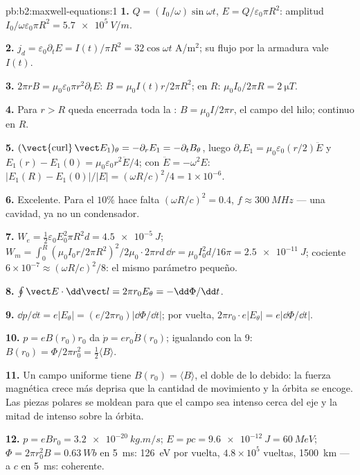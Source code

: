 \begin{solution}{pb:b2:maxwell-equations:1}
\textbf{1.} $Q = (I_0/\omega)\sin\omega t$, $E = Q/\varepsilon_0\pi R^2$: amplitud $I_0/\omega\varepsilon_0
\pi R^2 = \qty{5.7e5}{V/m}$.

\textbf{2.} $j_d = \varepsilon_0\partial_tE = I(t)/\pi R^2 = 32\cos\omega t$ A/m$^2$; su flujo
por la armadura vale $I(t)$.

\textbf{3.} $2\pi rB = \mu_0\varepsilon_0\pi r^2\partial_tE$: $B = \mu_0I(t)r/2\pi R^2$; en $R$:
$\mu_0I_0/2\pi R = \qty{2}{\micro T}$.

\textbf{4.} Para $r > R$ queda encerrada toda la : $B =
\mu_0I/2\pi r$, el campo del hilo; continuo en $R$.

\textbf{5.} $(\operatorname{\vect{curl}}\vect E_1)_\theta = -\partial_rE_1 = -\partial_tB_\theta$, luego $\partial_rE_1
= \mu_0\varepsilon_0(r/2)\ddot E$ y $E_1(r) - E_1(0) = \mu_0\varepsilon_0r^2\ddot E/4$; con
$\ddot E = -\omega^2E$: $|E_1(R) - E_1(0)|/|E| = (\omega R/c)^2/4 = 1 \times 10^{-6}$.

\textbf{6.} Excelente. Para el $10\%$ hace falta $(\omega R/c)^2 = 0.4$, $f \approx \qty{300}{MHz}$ ---
una cavidad, ya no un condensador.

\textbf{7.} $W_e = \tfrac12\varepsilon_0E_0^2\pi R^2d = \qty{4.5e-5}{J}$; $W_m = \int_0^R(\mu_0I_0r/
2\pi R^2)^2/2\mu_0\cdot2\pi rd\,\dd r = \mu_0I_0^2d/16\pi = \qty{2.5e-11}{J}$; cociente $6 \times
10^{-7} \approx (\omega R/c)^2/8$: el mismo parámetro pequeño.

\textbf{8.} $\oint\vect E\cdot\dd\vect l = 2\pi r_0E_\theta = -\dd\Phi/\dd t$.

\textbf{9.} $\dd p/\dd t = e|E_\theta| = (e/2\pi r_0)|\dd\Phi/\dd t|$; por vuelta,
$2\pi r_0\cdot e|E_\theta| = e|\dd\Phi/\dd t|$.

\textbf{10.} $p = eB(r_0)r_0$ da $\dot p = er_0\dot B(r_0)$; igualando con la 9:
$B(r_0) = \Phi/2\pi r_0^2 = \tfrac12\langle B\rangle$.

\textbf{11.} Un campo uniforme tiene $B(r_0) = \langle B\rangle$, el doble de lo
debido: la fuerza magnética crece más deprisa que la cantidad de
movimiento y la órbita se encoge. Las piezas polares se moldean para que
el campo sea intenso cerca del eje y la mitad de intenso sobre la órbita.

\textbf{12.} $p = eBr_0 = \qty{3.2e-20}{kg.m/s}$; $E = pc = \qty{9.6e-12}{J} = \qty{60}{MeV}$;
$\Phi = 2\pi r_0^2B = \qty{0.63}{Wb}$ en \qty{5}{ms}: \qty{126}{eV} por vuelta, $4.8 \times
10^5$ vueltas, \qty{1500}{km} --- a $c$ en \qty{5}{ms}: coherente.


\end{solution}
